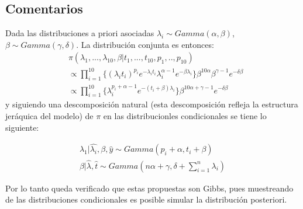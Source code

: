 \documentclass[preprint,12pt]{elsarticle}
\begin{document}
\subsection*{Comentarios}
Dada las distribuciones a priori asociadas $\lambda_i \sim Gamma(\alpha, \beta)$, $\beta \sim Gamma(\gamma, \delta)$.
%
La distribución conjunta es entonces:
\begin{equation}
    \begin{split}
    &\pi(\lambda_1, ..., \lambda_{10}, \beta | t_1, ..., t_{10}, p_1, .., p_{10}) \\  &\propto    \prod_{i=1}^{10} \{ (\lambda_i t_i)^{p_i} e^{-\lambda_i t_i} \lambda_i^{\alpha-1} e^{-\beta \lambda_i} \} \beta^{10 \alpha} \beta^{\gamma-1} e^{-\delta \beta} \\
       & \propto \prod_{i=1}^{10} \{ \lambda_i^{p_i + \alpha -1} e^{-(t_i + \beta)\lambda_i} \} \beta^{10 \alpha + \gamma -1} e^{-\delta \beta}
    \end{split}
\end{equation}
y siguiendo una descomposición natural (esta descomposición refleja la estructura jeráquica del modelo) de $\pi$ en las distribucionles condicionales se tiene lo siguiente:

\begin{equation}
    \begin{split}
          \lambda_1 | \hat{\lambda_i}, \beta, \hat{y} \sim Gamma(p_i + \alpha, t_i + \beta) \\
     \beta | \hat{\lambda}, \hat{t} \sim Gamma( n \alpha + \gamma, \delta + \sum_{i=1}^n \lambda_i  )
    \end{split}
\end{equation}

Por lo tanto queda verificado que estas propuestas son Gibbs, pues muestreando de las distribuciones condicionales es posible simular la distribución posteriori.
\end{document}
